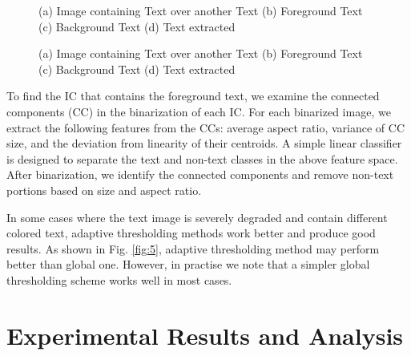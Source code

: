\begin{figure}[hbp]
\centering
{}
\caption
{(a) Image containing Text over another Text (b) Foreground Text (c) Background Text (d)
Text extracted}
\label{fig:7}
\end{figure}

\begin{figure}[hbp]
\centering
{}
\caption
{(a) Image containing Text over another Text (b) Foreground Text (c) Background Text (d)
Text extracted}
\label{fig:7}
\end{figure}
To find the IC that contains the foreground text, we examine the connected components (CC) in the 
binarization of each IC. For each binarized image, we extract the following features from the CCs: 
average aspect ratio, variance of  CC size, and the deviation from linearity of their centroids.
A simple linear classifier is designed to separate the text and non-text classes in the above feature space.
After binarization, we identify the
connected components and remove non-text portions based on size and aspect ratio.

In some cases where the text image is severely degraded and contain different colored text,
adaptive thresholding methods work better and produce good results. As shown in Fig. \ref{fig:5}, adaptive thresholding
method may perform better than global one. However, in practise we note that a simpler global thresholding
scheme works well in most cases.



\section{Experimental Results and Analysis}

